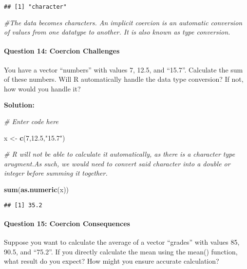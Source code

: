 \documentclass[
]{article}
\newenvironment{Shaded}{\begin{snugshade}}{\end{snugshade}}
\newcommand{\CommentTok}[1]{\textcolor[rgb]{0.56,0.35,0.01}{\textit{#1}}}
\newcommand{\DecValTok}[1]{\textcolor[rgb]{0.00,0.00,0.81}{#1}}
\newcommand{\FloatTok}[1]{\textcolor[rgb]{0.00,0.00,0.81}{#1}}
\newcommand{\FunctionTok}[1]{\textcolor[rgb]{0.13,0.29,0.53}{\textbf{#1}}}
\newcommand{\NormalTok}[1]{#1}
\newcommand{\OtherTok}[1]{\textcolor[rgb]{0.56,0.35,0.01}{#1}}
\newcommand{\StringTok}[1]{\textcolor[rgb]{0.31,0.60,0.02}{#1}}
\begin{document}
\begin{verbatim}
## [1] "character"
\end{verbatim}

\begin{Shaded}
\begin{Highlighting}[]
\CommentTok{\#The data becomes characters. An implicit coercion is an automatic conversion of values from one datatype to another. It is also known as type conversion.}
\end{Highlighting}
\end{Shaded}

\hypertarget{question-14-coercion-challenges}{%
\paragraph{Question 14: Coercion
Challenges}\label{question-14-coercion-challenges}}

You have a vector ``numbers'' with values 7, 12.5, and ``15.7''.
Calculate the sum of these numbers. Will R automatically handle the data
type conversion? If not, how would you handle it?

\textbf{Solution:}

\begin{Shaded}
\begin{Highlighting}[]
\CommentTok{\# Enter code here}

\NormalTok{x }\OtherTok{\textless{}{-}} \FunctionTok{c}\NormalTok{(}\DecValTok{7}\NormalTok{,}\FloatTok{12.5}\NormalTok{,}\StringTok{"15.7"}\NormalTok{)}

\CommentTok{\# R will not be able to calculate it automatically, as there is a character type arugment.As such, we would need to convert said character into a double or integer before summing it together.}

\FunctionTok{sum}\NormalTok{(}\FunctionTok{as.numeric}\NormalTok{(x))}
\end{Highlighting}
\end{Shaded}

\begin{verbatim}
## [1] 35.2
\end{verbatim}

\hypertarget{question-15-coercion-consequences}{%
\paragraph{Question 15: Coercion
Consequences}\label{question-15-coercion-consequences}}

Suppose you want to calculate the average of a vector ``grades'' with
values 85, 90.5, and ``75.2''. If you directly calculate the mean using
the mean() function, what result do you expect? How might you ensure
accurate calculation?
\end{document}
